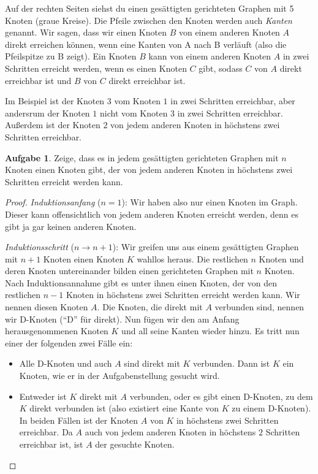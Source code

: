 \documentclass[a4paper,ngerman,12pt]{scrartcl}
\theoremstyle{definition}
\newtheorem*{aufg}{Aufgabe}
\begin{document}
Auf der rechten Seiten siehst du einen gesättigten gerichteten Graphen mit 5 Knoten (graue Kreise). Die Pfeile zwischen den Knoten werden auch {\em Kanten} genannt. Wir sagen, dass wir einen Knoten $B$ von einem anderen Knoten $A$ direkt erreichen können, wenn eine Kanten von A nach B verläuft (also die Pfeilspitze zu B zeigt). Ein Knoten $B$ kann von einem anderen Knoten $A$ in zwei Schritten erreicht werden, wenn es einen Knoten $C$ gibt, sodass $C$ von $A$ direkt erreichbar ist und $B$ von $C$ direkt erreichbar ist.

Im Beispiel ist der Knoten $3$ vom Knoten $1$ in zwei Schritten erreichbar, aber andersrum der Knoten $1$ nicht vom Knoten $3$ in zwei Schritten erreichbar. Außerdem ist der Knoten $2$ von jedem anderen Knoten in höchstens zwei Schritten erreichbar.

\begin{aufg}
  Zeige, dass es in jedem gesättigten gerichteten Graphen mit $n$ Knoten einen Knoten gibt, der von jedem anderen Knoten in höchstens zwei Schritten erreicht werden kann.
\end{aufg}

\begin{proof}
  \emph{Induktionsanfang} ($n=1$): Wir haben also nur einen Knoten im Graph. Dieser kann offensichtlich von jedem anderen Knoten erreicht werden, denn es gibt ja gar keinen anderen Knoten.

  \emph{Induktionsschritt} ($n \to n{+}1$):
  Wir greifen uns aus einem gesättigten Graphen mit $n+1$ Knoten einen Knoten $K$ wahllos heraus. Die restlichen $n$ Knoten und deren Knoten untereinander bilden einen gerichteten Graphen mit $n$ Knoten. Nach Induktionsannahme gibt es unter ihnen einen Knoten, der von den restlichen $n-1$ Knoten in höchstens zwei Schritten erreicht werden kann. Wir nennen diesen Knoten $A$. Die Knoten, die direkt mit $A$ verbunden sind, nennen wir D-Knoten ("`D"' für direkt). Nun fügen wir den am Anfang herausgenommenen Knoten $K$ und all seine Kanten wieder hinzu. Es tritt nun einer der folgenden zwei Fälle ein:
  \begin{itemize}
    \item Alle D-Knoten und auch $A$ sind direkt mit $K$ verbunden. Dann ist $K$ ein Knoten, wie er in der Aufgabenstellung gesucht wird.
    \item Entweder ist $K$ direkt mit $A$ verbunden, oder es gibt einen D-Knoten, zu dem $K$ direkt verbunden ist (also existiert eine Kante von $K$ zu einem D-Knoten). In beiden Fällen ist der Knoten $A$ von $K$ in höchstens zwei Schritten erreichbar. Da $A$ auch von jedem anderen Knoten in höchstens $2$ Schritten erreichbar ist, ist $A$ der gesuchte Knoten.\qedhere
  \end{itemize}
\end{proof}
\end{document}
